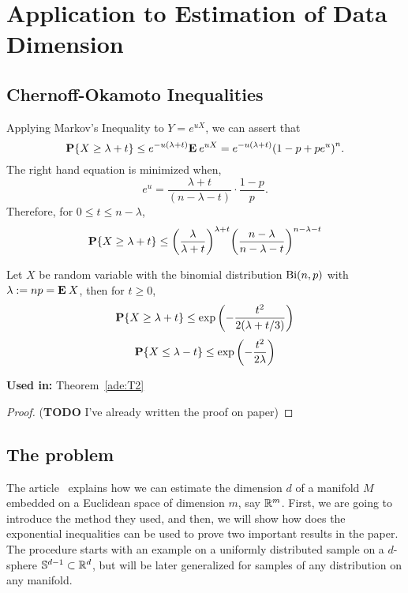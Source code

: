 \chapter{Application to Estimation of Data Dimension}

\section{Chernoff-Okamoto Inequalities}

Applying Markov's Inequality to $Y = e^{uX}$, we can assert that
  \[
    \P\{X \geq \lambda + t\} \leq e^{-u(\lambda+t)} \E e^{uX} = e^{-u(\lambda+ t)} {(1-p + p e^{u})}^n. 
  \] 
  The right hand equation is minimized when,
  \[ e^{u} = \frac{\lambda+t}{(n-\lambda-t)} \cdot \frac{1-p}{p}. \]
  Therefore, for $0 \leq t \leq n-\lambda$,
  \begin{equation}\label{co:1}
    \P\{X \geq \lambda + t\} \leq {\left(\frac{\lambda}{\lambda+t}\right)}^{\lambda + t} {\left(\frac{n-\lambda}{n-\lambda-t}\right)}^{n - \lambda - t}
  \end{equation}

\begin{theorem}\label{co:T1}
  Let $X$ be random variable with the binomial distribution $\Bi(n,p)$ with $\lambda := np = \E X$, then for $t \geq 0$,
  \begin{equation}\label{co:2}
    \P\{X \geq \lambda + t\} \leq \exp\left(- \frac{t^2}{2(\lambda+t/3)}\right)
  \end{equation}
  \begin{equation}\label{co:3}
    \P\{X \leq \lambda - t\} \leq \exp\left(- \frac{t^2}{2\lambda}\right)
  \end{equation}
\end{theorem}

\textbf{Used in:} Theorem~\ref{ade:T2}

\begin{proof}
  (\textbf{TODO} I've already written the proof on paper)
\end{proof}

\section{The problem}

The article~\cite{diaz2019local} explains how we can estimate the dimension $d$ of a manifold $M$ embedded on a Euclidean space of dimension $m$, say $\R^m$. First, we are going to introduce the method they used, and then, we will show how does the exponential inequalities can be used to prove two important results in the paper. The procedure starts with an example on a uniformly distributed sample on a $d$-sphere $\S^{d-1} \subset \R^d$, but will be later generalized for samples of any distribution on any manifold.\\[1em]

